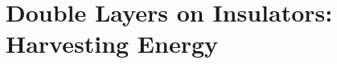 \tableofcontents{}
\listoffigures
\listoftables
\doublespacing


%   
%   


\part{Double Layers on Insulators: Harvesting Energy}
   \label{part:doubleLayersOnInsulators}
%
%
%     

